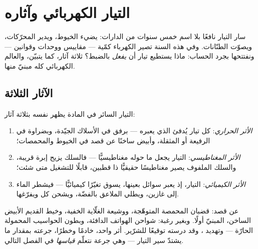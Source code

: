 \chapter{التيار الكهربائي وآثاره}\label{ch:g8:electric-current-effects}

سار التيار نافعًا بلا اسم خمس سنوات من الدارات: يضيء الخيوط،
ويدير المحرّكات، ويصوّت الطنّانات. وفي هذه السنة تصير الكهرباء
كمّية --- مقاييس ووحدات وقوانين --- ونفتتحها بجرد الحساب: ماذا
يستطيع تيار أن \emph{يفعل} بالضبط؟ ثلاثة آثار، كما يتبيّن،
والعالم الكهربائي كله مبنيّ منها.

\section{الآثار الثلاثة}

\begin{proposition}\label{prop:g8:electric-current-effects:three}
التيار السائر في المادة يظهر نفسه بثلاثة آثار:
\begin{enumerate}
  \item \emph{الأثر الحراري}: كل تيار يُدفئ
         الذي يعبره --- برفق في الأسلاك الجيّدة، وبضراوة
        في الرفيعة أو المثقلة، وأبيض ساخنًا عن قصد في الخيوط
        والمحمصات؛
  \item \emph{الأثر المغناطيسي}: التيار
        يجعل ما حوله مغناطيسيًّا --- فالسلك يزيح إبرة 
        قريبة، والسلك الملفوف يصير مغناطيسًا حقيقيًّا ذا قطبين،
        قابلًا للتشغيل متى شئت؛
  \item \emph{الأثر الكيميائي}: التيار، إذ
        يعبر سوائل بعينها، يسوق تغيّرًا كيميائيًّا --- فيشطر
        الماء إلى غازين، ويطلي الملاعق بالفضّة، ويشحن كل
         ويفرّغها.
\end{enumerate}
\end{proposition}

\begin{example}\label{ex:g8:electric-current-effects:heating}
عن قصد: قضبان المحمصة المتوهّجة، ووشيعة الغلّاية الخفية، وخيط
 القديم الأبيض الساخن،  المبنيّ  أولًا.
وبغير رغبة: شواحن الهواتف الدافئة، وبطون الحواسيب المحمولة
الحارّة --- وتهديد ، وقد درسته توقيعًا للشرّير.
أثر واحد، خادمًا وخطرًا، جرعته بمقدار ما يشتدّ سير التيار ---
وهي جرعة نتعلّم \emph{قياسها} في الفصل التالي.
\end{example}

